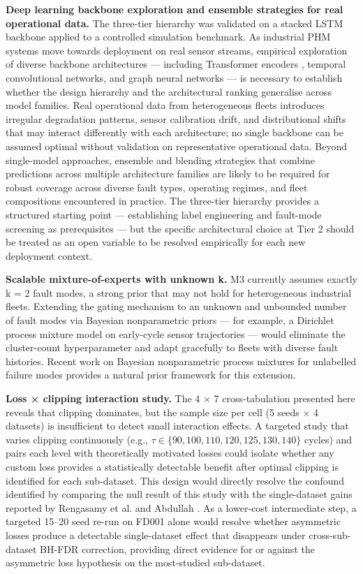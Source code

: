 \documentclass[review,12pt]{elsarticle}
\begin{document}
\textbf{Deep learning backbone exploration and ensemble strategies for real operational data.} The three-tier hierarchy was validated on a stacked LSTM backbone applied to a controlled simulation benchmark. As industrial PHM systems move towards deployment on real sensor streams, empirical exploration of diverse backbone architectures — including Transformer encoders \cite{ref08,ref11,ref13,ref14}, temporal convolutional networks, and graph neural networks — is necessary to establish whether the design hierarchy and the architectural ranking generalise across model families. Real operational data from heterogeneous fleets introduces irregular degradation patterns, sensor calibration drift, and distributional shifts that may interact differently with each architecture; no single backbone can be assumed optimal without validation on representative operational data. Beyond single-model approaches, ensemble and blending strategies that combine predictions across multiple architecture families are likely to be required for robust coverage across diverse fault types, operating regimes, and fleet compositions encountered in practice. The three-tier hierarchy provides a structured starting point — establishing label engineering and fault-mode screening as prerequisites — but the specific architectural choice at Tier 2 should be treated as an open variable to be resolved empirically for each new deployment context.

\textbf{Scalable mixture-of-experts with unknown k.} M3 currently assumes exactly k = 2 fault modes, a strong prior that may not hold for heterogeneous industrial fleets. Extending the gating mechanism to an unknown and unbounded number of fault modes via Bayesian nonparametric priors — for example, a Dirichlet process mixture model on early-cycle sensor trajectories \cite{ref34} — would eliminate the cluster-count hyperparameter and adapt gracefully to fleets with diverse fault histories. Recent work on Bayesian nonparametric process mixtures for unlabelled failure modes \cite{ref34} provides a natural prior framework for this extension.

\textbf{Loss × clipping interaction study.} The 4 × 7 cross-tabulation presented here reveals that clipping dominates, but the sample size per cell (5 seeds × 4 datasets) is insufficient to detect small interaction effects. A targeted study that varies clipping continuously (e.g., $\tau \in \{90, 100, 110, 120, 125, 130, 140\}$ cycles) and pairs each level with theoretically motivated losses could isolate whether any custom loss provides a statistically detectable benefit after optimal clipping is identified for each sub-dataset. This design would directly resolve the confound identified by comparing the null result of this study with the single-dataset gains reported by Rengasamy et al. \cite{ref37} and Abdullah \cite{ref22}. As a lower-cost intermediate step, a targeted 15--20 seed re-run on FD001 alone would resolve whether asymmetric losses produce a detectable single-dataset effect that disappears under cross-sub-dataset BH-FDR correction, providing direct evidence for or against the asymmetric loss hypothesis on the most-studied sub-dataset.
\end{document}
